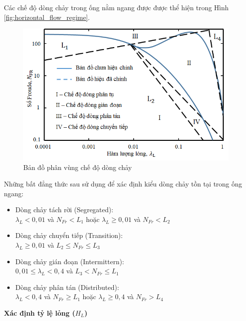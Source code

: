 \documentclass[12pt,a4paper]{report}
\begin{document}
Các chế độ dòng chảy trong ống nằm ngang được được thể hiện trong Hình \ref{fig:horizontal_flow_regime}.
	\begin{figure}[h]
		\centering
		\includegraphics[scale=0.75]{Fig/liquid_holdup_gamma_l.png}
		\caption[Bản đồ phân vùng chế độ dòng chảy]{Bản đồ phân vùng chế độ dòng chảy \cite{brill1999multiphase}}
		\label{fig:liquid_holdup_gamma_l}
	\end{figure}
\newline
Những bất đẳng thức sau sử dụng để xác định kiểu dòng chảy tồn tại trong ống ngang:
	\begin{itemize}
		\item Dòng chảy tách rời (Segregated):\\
		$\lambda_L<0,01$ và $N_{Fr}<L_1$ hoặc $\lambda_L\ge0,01$ và $N_{Fr}<L_2$
		\item Dòng chảy chuyển tiếp (Transition):\\
		$\lambda_L\ge0,01$ và $L_2\leq N_{Fr}\leq L_3$
		\item Dòng chảy gián đoạn (Intermittern):\\
		$0,01\leq\lambda_L<0,4$ và $L_3<N_{Fr}\leq L_1 $
		\item Dòng chảy phân tán (Distributed):\\
		$\lambda_L<0,4$ và $N_{Fr}\ge L_1$ hoặc $\lambda_L\ge 0,4$ và $N_{Fr}>L_4$
	\end{itemize}

\textbf{Xác định tỷ lệ lỏng ($H_L$)}
\end{document}
